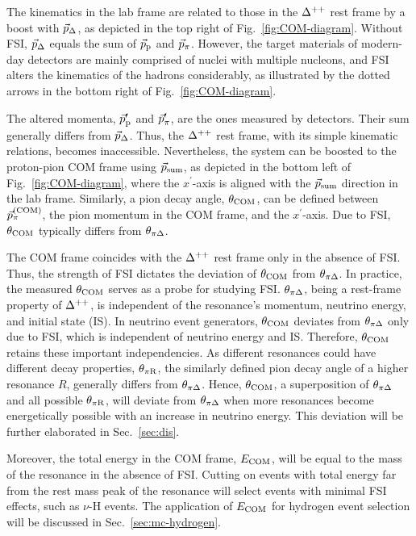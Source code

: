 The kinematics in the lab frame are related to those in the $\Delta^{++}$ rest frame by a boost with $\vec{p}_{\Delta}$, as depicted in the top right of Fig.~\ref{fig:COM-diagram}. 
Without FSI, $\vec{p}_{\Delta}$ equals the sum of $\vec{p}_\textrm{p}$ and $\vec{p}_{\pi}$.
However, the target materials of modern-day detectors are mainly comprised of nuclei with multiple nucleons, and FSI alters the kinematics of the hadrons considerably, as illustrated by the dotted arrows in the bottom right of Fig.~\ref{fig:COM-diagram}.

The altered momenta, $\vec{p}_\textrm{p}^{\prime}$ and $\vec{p}_{\pi}^{\prime}$, are the ones measured by detectors. 
Their sum generally differs from $\vec{p}_{\Delta}$.
Thus, the $\Delta^{++}$ rest frame, with its simple kinematic relations, becomes inaccessible.
Nevertheless, the system can be boosted to the proton-pion COM frame using $\vec{p}_{\textrm{sum}}$, as depicted in the bottom left of Fig.~\ref{fig:COM-diagram}, where the $x^{\prime}$-axis is aligned with the $\vec{p}_{\textrm{sum}}$ direction in the lab frame.
Similarly, a pion decay angle, $\theta_{\textrm{COM}}$, can be defined between $\vec{p}_{\pi}^{(\textrm{COM})}$, the pion momentum in the COM frame, and the $x^{\prime}$-axis.
Due to FSI, $\theta_{\textrm{COM}}$ typically differs from $\theta_{\pi\Delta}$. 

The COM frame coincides with the $\Delta^{++}$ rest frame only in the absence of FSI.
Thus, the strength of FSI dictates the deviation of $\theta_{\textrm{COM}}$ from $\theta_{\pi\Delta}$. 
In practice, the measured $\theta_{\textrm{COM}}$ serves as a probe for studying FSI. 
$\theta_{\pi\Delta}$, being a rest-frame property of $\Delta^{++}$, is independent of the resonance's momentum, neutrino energy, and initial state (IS).
In neutrino event generators, $\theta_{\textrm{COM}}$ deviates from $\theta_{\pi\Delta}$ only due to FSI, which is independent of neutrino energy and IS.
Therefore, $\theta_{\textrm{COM}}$ retains these important independencies.
As different resonances could have different decay properties, $\theta_{\pi\textrm{R}}$, the similarly defined pion decay angle of a higher resonance $R$, generally differs from $\theta_{\pi\Delta}$. 
Hence, $\theta_{\textrm{COM}}$, a superposition of $\theta_{\pi\Delta}$ and all possible $\theta_{\pi\textrm{R}}$, will deviate from $\theta_{\pi\Delta}$ when more resonances become energetically possible with an increase in neutrino energy. 
This deviation will be further elaborated in Sec.~\ref{sec:dis}.

Moreover, the total energy in the COM frame, $E_{\textrm{COM}}$, will be equal to the mass of the resonance in the absence of FSI.
Cutting on events with total energy far from the rest mass peak of the resonance will select events with minimal FSI effects, such as $\nu$-H events. 
The application of $E_{\textrm{COM}}$ for hydrogen event selection will be discussed in Sec.~\ref{sec:mc-hydrogen}.

